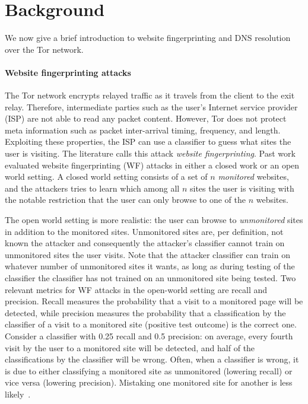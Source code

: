 \section{Background}
\label{sec:background}
We now give a brief introduction to website fingerprinting and DNS resolution
over the Tor network.

\paragraph{Website fingerprinting attacks}
The Tor network encrypts relayed traffic as it travels from the client to the
exit relay.  Therefore, intermediate parties such as the user's Internet service
provider (ISP) are not able to read any packet content.  However, Tor does not
protect meta information such as packet inter-arrival timing, frequency, and
length.  Exploiting these properties, the ISP can use a classifier to guess what
sites the user is visiting.  The literature calls this attack \emph{website
fingerprinting}.  Past work evaluated website fingerprinting (WF) attacks in
either a closed work or an open world setting.
A closed world setting consists of a set
of $n$ \emph{monitored} websites, and the attackers tries to learn which among
all $n$ sites the user is visiting with the notable restriction that the user
can only browse to one of the $n$ websites.

The open world setting is more realistic: the user can browse to
\emph{unmonitored} sites in addition to the monitored sites. Unmonitored sites
are, per definition, not known the attacker and consequently the attacker's
classifier cannot train on unmonitored sites the user visits. Note that the
attacker classifier can train on whatever number of unmonitored sites it wants,
as long as during testing of the classifier the classifier has not trained on
an unmonitored site being tested. Two relevant metrics for WF attacks in the
open-world setting are recall and precision.
Recall measures the probability that a visit to a monitored
page will be detected, while precision measures the probability
that a classification by the classifier of a visit to a monitored
site (positive test outcome) is the correct one. Consider a classifier with
0.25 recall and 0.5 precision: on average, every fourth visit by the user to
a monitored site will be detected, and half of the classifications by the
classifier will be wrong. Often, when a classifier is wrong,
it is due to either classifying a monitored site as unmonitored (lowering
recall) or vice versa (lowering precision).
Mistaking one monitored site for another is less likely~\cite{WangThesis}.

